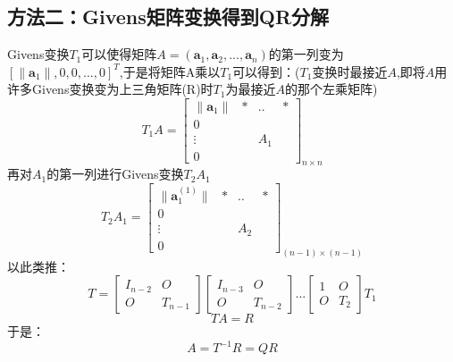 \documentclass[12pt]{article}
\begin{document}
\begin{CJK*}{UTF8}{gbsn}
\subsection{方法二：Givens矩阵变换得到QR分解}
Givens变换$T_1$可以使得矩阵$A=(\bm a_1,\bm a_2,...,\bm a_n)$的第一列变为~$[\|\bm a_1\|,0,0,...,0]^T$,于是将矩阵A乘以$T_1$可以得到：($T_1$变换时最接近$A$,即将$A$用许多Givens变换变为上三角矩阵(R)时$T_1$为最接近$A$的那个左乘矩阵)
\begin{equation}
	T_1A=\begin{bmatrix}
	\|\bm a_1\|& *&..&* \\
	0& & \\
	\vdots &&A_1\\
	0& 
\end{bmatrix}_{n\times n}
\end{equation}
再对$A_1$的第一列进行Givens变换$T_2A_1$
\begin{equation}
	T_2A_1=\begin{bmatrix}
	\|\bm a^{(1)}_1\|& *&..&* \\
	0& & \\
	\vdots &&A_2\\
	0& 
\end{bmatrix}_{(n-1)\times (n-1)}
\end{equation}
以此类推：
\begin{equation}
	T=
	\begin{bmatrix}
	I_{n-2}& O \\
	O& T_{n-1} 
\end{bmatrix}\begin{bmatrix}
	I_{n-3}& O \\
	O& T_{n-2} 
\end{bmatrix}...\begin{bmatrix}
	1 &O \\
	O& T_2 
\end{bmatrix}T_1
\end{equation}
\begin{equation}
	TA=R
\end{equation}
于是：
\begin{equation}
	A=T^{-1}R=QR
\end{equation}

\end{CJK*}
\end{document}
